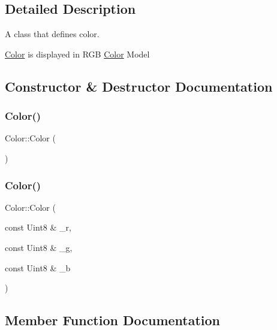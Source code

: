 \subsection{Detailed Description}
A class that defines color. 

\mbox{\hyperlink{class_color}{Color}} is displayed in R\+GB \mbox{\hyperlink{class_color}{Color}} Model 

\subsection{Constructor \& Destructor Documentation}
\mbox{\label{class_color_a9a742cbe9f9f4037f5d9f4e81a9b2428}} 
\subsubsection{\texorpdfstring{Color()}{Color()}\hspace{0.1cm}{\footnotesize\ttfamily [1/2]}}
{\footnotesize\ttfamily Color\+::\+Color (\begin{DoxyParamCaption}{ }\end{DoxyParamCaption})\hspace{0.3cm}{\ttfamily [inline]}}

\mbox{\label{class_color_ae9ef762fa628be655fef146879922545}} 
\subsubsection{\texorpdfstring{Color()}{Color()}\hspace{0.1cm}{\footnotesize\ttfamily [2/2]}}
{\footnotesize\ttfamily Color\+::\+Color (\begin{DoxyParamCaption}\item[{const Uint8 \&}]{\+\_\+r,  }\item[{const Uint8 \&}]{\+\_\+g,  }\item[{const Uint8 \&}]{\+\_\+b }\end{DoxyParamCaption})\hspace{0.3cm}{\ttfamily [inline]}}



\subsection{Member Function Documentation}
\mbox{\label{class_color_ad6cf831bb3384fb165ec681b40899049}} 
